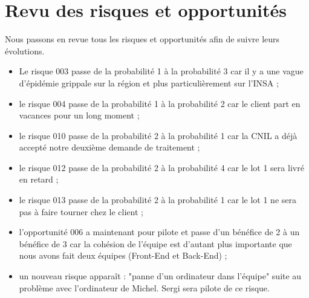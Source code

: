 \documentclass [a4paper] {article}
\begin{document}
\section{Revu des risques et opportunités}
Nous passons en revue tous les risques et opportunités afin de suivre leurs évolutions. 
\begin{itemize}
	\item Le risque 003 passe de la probabilité 1 à la probabilité 3 car il y a une vague d'épidémie grippale sur la région et plus particulièrement sur l'INSA ;
	\item le risque 004 passe de la probabilité 1 à la probabilité 2 car le client part en vacances pour un long moment ;
	\item le risque 010 passe de la probabilité 2 à la probabilité 1 car la CNIL a déjà accepté notre deuxième demande de traitement ;
	\item le risque 012 passe de la probabilité 2 à la probabilité 4 car le lot 1 sera livré en retard ;
	\item le risque 013 passe de la probabilité 2 à la probabilité 1 car le lot 1 ne sera pas à faire tourner chez le client ;
	\item l'opportunité 006 a maintenant pour pilote \Michel{} et passe d'un bénéfice de 2 à un bénéfice de 3 car la cohésion de l'équipe est d'autant plus importante que nous avons fait deux équipes (Front-End et Back-End) ;
	\item un nouveau risque apparaît : "panne d'un ordinateur dans l'équipe" suite au problème avec l'ordinateur de Michel. Sergi sera pilote de ce risque.
\end{itemize}





\end{document}
